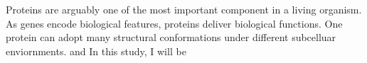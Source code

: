 Proteins are arguably one of the most important component in a living organism. As genes encode biological features, proteins deliver biological functions. One protein can adopt many structural conformations under different subcelluar enviornments. and   In this study, I will be 